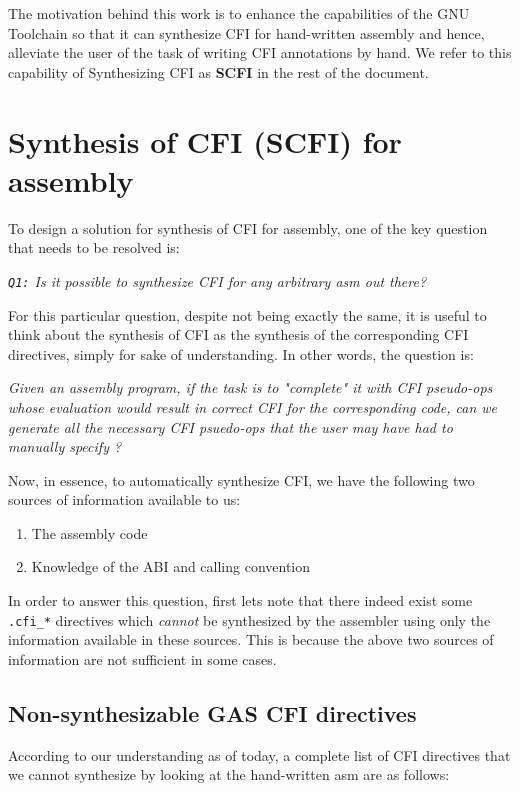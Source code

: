 \documentclass{article} \usepackage[a4paper, total={6in, 8in}]{geometry}
\begin{document}
The motivation behind this work is to enhance the capabilities of the GNU
Toolchain so that it can synthesize CFI for hand-written assembly and
hence, alleviate the user of the task of writing CFI annotations by hand.
We refer to this capability of Synthesizing CFI as \textbf{SCFI} in the
rest of the document.

\section{Synthesis of CFI (SCFI) for assembly}
To design a solution for synthesis of CFI for assembly, one of the key
question that needs to be resolved is:  

\begin{center} \emph{\texttt{Q1:} Is it possible to synthesize CFI for any
arbitrary asm out there?} \end{center}

For this particular question, despite not being exactly the same, it is useful
to think about the synthesis of CFI as the synthesis of the corresponding CFI
directives, simply for sake of understanding. In other words, the question is:

\textit{Given an assembly program, if the task is to "complete" it with CFI
pseudo-ops whose evaluation would result in correct CFI for  the
corresponding code, can we generate all the necessary CFI psuedo-ops that
the user may have had to manually specify ?}

Now, in essence, to automatically synthesize CFI, we have the following two
sources of information available to us:

\begin{enumerate}

\item The assembly code
\item Knowledge of the ABI and calling convention

\end{enumerate}

In order to answer this question, first lets note that there indeed exist some
\texttt{.cfi\_*} directives which \emph{cannot} be synthesized by the assembler
using only the information available in these sources.  This is because the
above two sources of information are not sufficient in some cases.

\subsection{Non-synthesizable GAS CFI directives}
\label{nonsynthcfi}
According to our understanding as of today, a complete list of CFI directives
that we cannot synthesize by looking at the hand-written asm are as follows:
\end{document}
